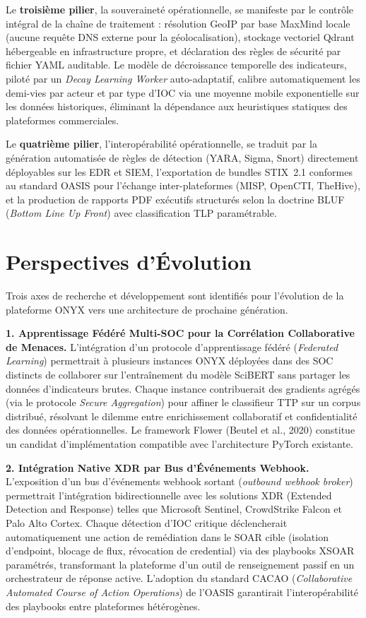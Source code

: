 Le \textbf{troisième pilier}, la souveraineté opérationnelle, se manifeste par le contrôle intégral de la chaîne de traitement : résolution GeoIP par base MaxMind locale (aucune requête DNS externe pour la géolocalisation), stockage vectoriel Qdrant hébergeable en infrastructure propre, et déclaration des règles de sécurité par fichier YAML auditable. Le modèle de décroissance temporelle des indicateurs, piloté par un \textit{Decay Learning Worker} auto-adaptatif, calibre automatiquement les demi-vies par acteur et par type d'IOC via une moyenne mobile exponentielle sur les données historiques, éliminant la dépendance aux heuristiques statiques des plateformes commerciales.

Le \textbf{quatrième pilier}, l'interopérabilité opérationnelle, se traduit par la génération automatisée de règles de détection (YARA, Sigma, Snort) directement déployables sur les EDR et SIEM, l'exportation de bundles STIX~2.1 conformes au standard OASIS pour l'échange inter-plateformes (MISP, OpenCTI, TheHive), et la production de rapports PDF exécutifs structurés selon la doctrine BLUF (\textit{Bottom Line Up Front}) avec classification TLP paramétrable.

\section*{Perspectives d'Évolution}

Trois axes de recherche et développement sont identifiés pour l'évolution de la plateforme ONYX vers une architecture de prochaine génération.

\textbf{1. Apprentissage Fédéré Multi-SOC pour la Corrélation Collaborative de Menaces.} L'intégration d'un protocole d'apprentissage fédéré (\textit{Federated Learning}) permettrait à plusieurs instances ONYX déployées dans des SOC distincts de collaborer sur l'entraînement du modèle SciBERT sans partager les données d'indicateurs brutes. Chaque instance contribuerait des gradients agrégés (via le protocole \textit{Secure Aggregation}) pour affiner le classifieur TTP sur un corpus distribué, résolvant le dilemme entre enrichissement collaboratif et confidentialité des données opérationnelles. Le framework Flower (Beutel et al., 2020) constitue un candidat d'implémentation compatible avec l'architecture PyTorch existante.

\textbf{2. Intégration Native XDR par Bus d'Événements Webhook.} L'exposition d'un bus d'événements webhook sortant (\textit{outbound webhook broker}) permettrait l'intégration bidirectionnelle avec les solutions XDR (Extended Detection and Response) telles que Microsoft Sentinel, CrowdStrike Falcon et Palo Alto Cortex. Chaque détection d'IOC critique déclencherait automatiquement une action de remédiation dans le SOAR cible (isolation d'endpoint, blocage de flux, révocation de credential) via des playbooks XSOAR paramétrés, transformant la plateforme d'un outil de renseignement passif en un orchestrateur de réponse active. L'adoption du standard CACAO (\textit{Collaborative Automated Course of Action Operations}) de l'OASIS garantirait l'interopérabilité des playbooks entre plateformes hétérogènes.

